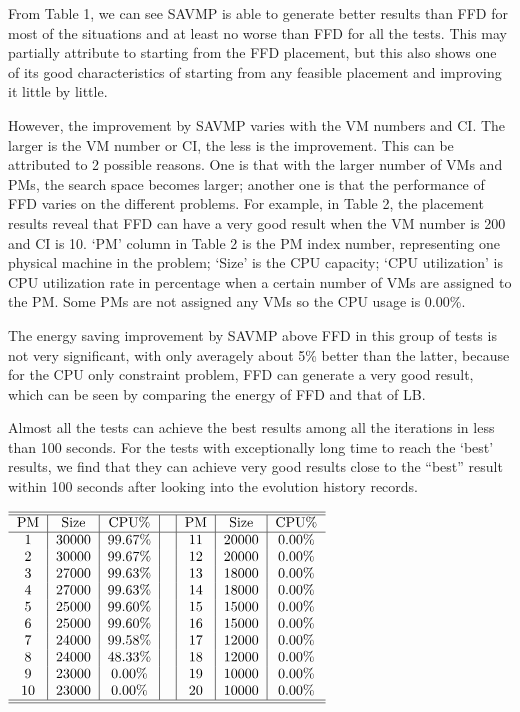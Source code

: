 \documentclass[10pt, conference, compsocconf]{IEEEtran}
\begin{document}
From Table 1, we can see SAVMP is able to generate
better results than FFD for most of the situations and at least no worse than FFD for all the tests.
This may partially attribute to starting from the FFD placement, but this also
shows one of its good characteristics of starting from any feasible placement
and improving it little by little.

However, the improvement by SAVMP varies with the VM numbers and CI. The larger
is the VM number or CI, the less is the improvement. This can be attributed to 2
possible reasons. One is that with the larger number of VMs and PMs, the search
space becomes larger; another one is that the performance of FFD varies on the
different problems. For example, in Table 2, the placement results reveal that
FFD can have a very good result when the VM number is 200 and CI is 10. `PM' column in Table 2
is the PM index number, representing one physical machine in the problem; `Size'
is the CPU capacity; `CPU utilization' is CPU utilization rate in percentage
when a certain number of VMs are assigned to the PM. Some PMs are not assigned any VMs so the CPU usage is
0.00\%.

The energy saving improvement by SAVMP above FFD in this group of tests is not
very significant, with only averagely about 5\% better than the latter, because for the CPU only
constraint problem, FFD can generate a very good result, which can be seen by
comparing the energy of FFD and that of LB.

Almost all the tests can achieve the best results among all the iterations in
less than 100 seconds. For the tests with exceptionally long time to reach the
`best' results, we find that they can achieve very good results close to
the ``best'' result within 100 seconds after looking into the evolution
history records.


\begin{table}[h]
\begin{center}
\caption{VM placement results by FFD on 200 VMs
 with capacity index of 10}
$\begin{tabular}{c|c|c|c|c|c|c}
\hline\hline

PM & Size & CPU\% & & PM & Size & CPU\% \\
\hline
1 & 30000 & 99.67\% & & 11 & 20000 & 0.00\%\\
2 & 30000 & 99.67\% & & 12 & 20000 & 0.00\%\\
3 & 27000 & 99.63\% & & 13 & 18000 & 0.00\%\\
4 & 27000 & 99.63\% & & 14 & 18000 & 0.00\%\\
5 & 25000 & 99.60\% & & 15 & 15000 & 0.00\%\\
6 & 25000 & 99.60\% & & 16 & 15000 & 0.00\%\\
7 & 24000 & 99.58\% & & 17 & 12000 & 0.00\%\\
8 & 24000 & 48.33\% & & 18 & 12000 & 0.00\%\\
9 & 23000 & 0.00\% & & 19 & 10000 & 0.00\%\\
10 & 23000 & 0.00\% & & 20 & 10000 & 0.00\%\\
\hline\hline
\end{tabular}$
\end{center}
\end{table}
\end{document}
